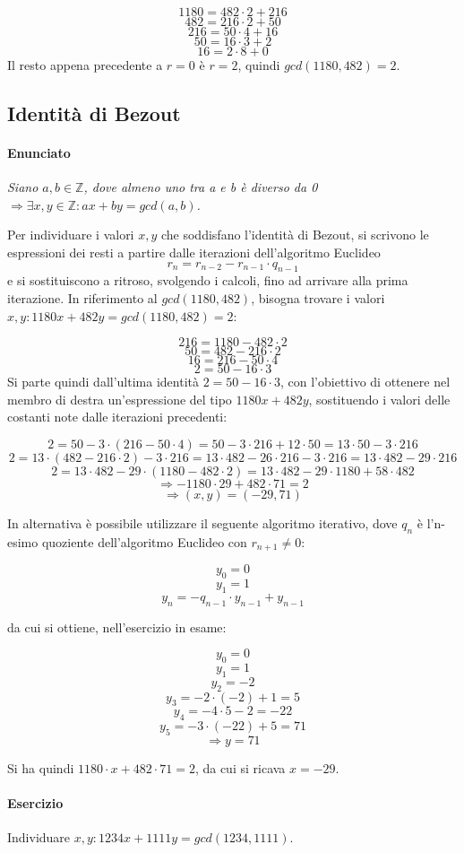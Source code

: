 \documentclass[a4paper]{report}
\begin{document}
$$1180=482\cdot 2 + 216$$
$$482=216\cdot 2 + 50$$
$$216=50\cdot 4 + 16$$
$$50=16\cdot 3 + 2$$
$$16 = 2\cdot 8 + 0$$
Il resto appena precedente a $r=0$ è $r=2$, quindi $gcd(1180,482)=2$.
\subsection{Identità di Bezout}
\paragraph{Enunciato} \textit{Siano $a,b \in \mathbb{Z}$, dove almeno uno tra a e b è diverso da 0 $\Rightarrow \exists x,y \in \mathbb{Z}: ax+by=gcd(a,b)$.}

Per individuare i valori $x,y$ che soddisfano l'identità di Bezout, si scrivono le espressioni dei resti a partire dalle iterazioni dell'algoritmo Euclideo
$$r_n=r_{n-2}-r_{n-1}\cdot q_{n-1}$$
e si sostituiscono a ritroso, svolgendo i calcoli, fino ad arrivare alla prima iterazione. In riferimento al $gcd(1180,482)$, bisogna trovare i valori $x,y: 1180x+482y=gcd(1180,482)=2$:

$$216=1180-482\cdot 2$$
$$50=482-216\cdot 2$$
$$16=216-50\cdot 4$$
$$2=50-16\cdot 3$$
Si parte quindi dall'ultima identità $2=50-16\cdot 3$, con l'obiettivo di ottenere nel membro di destra un'espressione del tipo $1180x+482y$, sostituendo i valori delle costanti note dalle iterazioni precedenti:

$$2=50-3\cdot(216-50\cdot 4)=50-3\cdot 216 + 12\cdot 50=13\cdot 50 - 3\cdot 216$$
$$2=13\cdot (482-216\cdot2) - 3\cdot 216=13\cdot 482 -26\cdot 216-3\cdot 216=13\cdot 482 -29\cdot 216$$
$$2=13\cdot 482 - 29\cdot (1180-482\cdot 2)=13\cdot 482-29\cdot 1180 + 58\cdot 482$$
$$\Rightarrow - 1180\cdot 29 + 482\cdot 71 = 2 $$
$$\Rightarrow (x,y)=(-29,71)$$

In alternativa è possibile utilizzare il seguente algoritmo iterativo, dove $q_n$ è l'n-esimo quoziente dell'algoritmo Euclideo con $r_{n+1}\neq 0$:

$$y_0=0$$
$$y_1=1$$
$$y_n=-q_{n-1}\cdot y_{n-1}+y_{n-1}$$

da cui si ottiene, nell'esercizio in esame:

$$y_0=0$$
$$y_1=1$$
$$y_2=-2$$
$$y_3=-2\cdot (-2)+1=5$$
$$y_4=-4\cdot5-2=-22$$
$$y_5=-3\cdot (-22)+5=71$$
$$\Rightarrow y=71$$

Si ha quindi $1180\cdot x + 482\cdot 71 = 2$, da cui si ricava $x=-29$.

\paragraph{Esercizio} Individuare $x,y:1234x+1111y=gcd(1234,1111)$.
\end{document}
